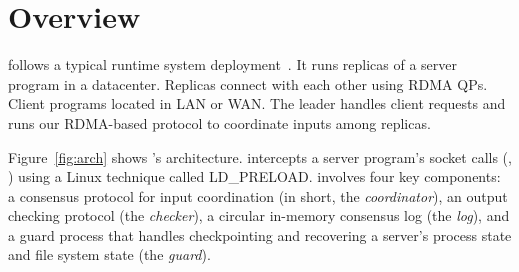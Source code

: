 
\section{\xxx Overview}\label{sec:overview}

 





\xxx follows a typical \paxos runtime system 
deployment~\cite{scatter:sosp11,eve:osdi12,rex:eurosys14,crane:sosp15, 
dare:hpdc15}. It runs replicas of a server program in a datacenter. Replicas 
connect with each other using RDMA QPs. Client programs located in LAN or WAN. 
The leader handles client requests and runs our RDMA-based \paxos protocol to 
coordinate inputs among replicas.

Figure~\ref{fig:arch} shows \xxx's architecture. \xxx intercepts a server 
program's socket calls (\eg, \recv) using a Linux technique called LD\_PRELOAD. 
\xxx involves four key components: a \paxos consensus protocol for input 
coordination (in short, the \emph{coordinator}), an output checking protocol 
(the \emph{checker}), a circular in-memory consensus log (the 
\emph{log}), and a guard process that handles checkpointing and recovering a 
server's process state and file system state (the \emph{guard}).

